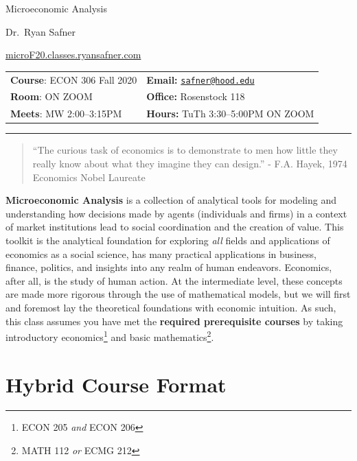 \documentclass{article}
\begin{document}
\sffamily

\centerline{\Huge Microeconomic Analysis}

\vspace{3 mm}

\centerline{\large Dr.~Ryan Safner}
\vspace{2 mm}
\centerline{\large \href{http://microF20.classes.ryansafner.com}{microF20.classes.ryansafner.com}}

\vspace{5 mm}

\begin{tabular}{@{}p{3.5in}p{3.5in}}           
\textbf{Course}: ECON 306 Fall 2020  & \textbf{Email:}  \href{mailto:safner@hood.edu}{\nolinkurl{safner@hood.edu}}\\
\textbf{Room}: ON ZOOM & \textbf{Office:}  Rosenstock 118\\
\textbf{Meets}: MW 2:00--3:15PM & \textbf{Hours:} TuTh 3:30--5:00PM ON ZOOM\\ 
\end{tabular}

\vspace{5 mm}

\hrule


\begin{quote}
``The curious task of economics is to demonstrate to men how little they
really know about what they imagine they can design.'' - F.A. Hayek,
1974 Economics Nobel Laureate
\end{quote}

\textbf{Microeconomic Analysis} is a collection of analytical tools for
modeling and understanding how decisions made by agents (individuals and
firms) in a context of market institutions lead to social coordination
and the creation of value. This toolkit is the analytical foundation for
exploring \emph{all} fields and applications of economics as a social
science, has many practical applications in business, finance, politics,
and insights into any realm of human endeavors. Economics, after all, is
the study of human action. At the intermediate level, these concepts are
made more rigorous through the use of mathematical models, but we will
first and foremost lay the theoretical foundations with economic
intuition. As such, this class assumes you have met the \textbf{required
prerequisite courses} by taking introductory economics\footnote{ECON 205
  \emph{and} ECON 206} and basic mathematics\footnote{MATH 112 \emph{or}
  ECMG 212}.

\hypertarget{hybrid-course-format}{%
\section*{Hybrid Course Format}\label{hybrid-course-format}}
\end{document}
